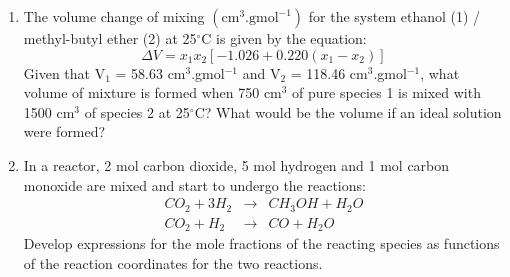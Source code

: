 \documentclass[calculator,fluidstables,datasheet,sample]{exam}
\begin{document}
\clearpage
\begin{question}
\begin{enumerate}
\item The volume change of mixing $\left(\text{cm}^{3}.\text{gmol}^{-1}\right)$ for the system ethanol (1) / methyl-butyl ether (2) at 25$^{\circ}$C is given by the equation:
\begin{displaymath}
\Delta V = x_{1}x_{2}\left[-1.026+0.220\left(x_{1}-x_{2}\right)\right]
\end{displaymath}
Given that V$_{1}$ = 58.63 cm$^{3}$.gmol$^{-1}$ and V$_{2}$ = 118.46 cm$^{3}$.gmol$^{-1}$, what volume of mixture is formed when 750 cm$^{3}$ of pure species 1 is mixed with 1500 cm$^{3}$ of species 2 at 25$^{\circ}$C? What would be the volume if an ideal solution were formed?~

\item In a reactor, 2 mol carbon dioxide, 5 mol hydrogen and 1 mol carbon monoxide are mixed and start to undergo the reactions:
\begin{eqnarray}
CO_{2} + 3 H_{2} &\rightarrow& CH_{3}OH +H_{2}O\nonumber \\
CO_{2} + H_{2}  &\rightarrow& CO + H_{2}O\nonumber
\end{eqnarray}
Develop expressions for the mole fractions of the reacting species as functions of the reaction coordinates for the two reactions.~

\end{enumerate}
\end{question}
\end{document}
